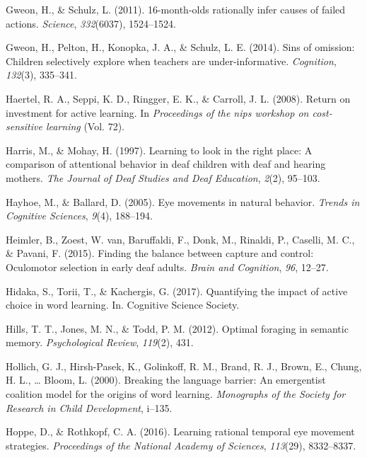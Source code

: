 \documentclass[oneside]{report}
\begin{document}
\hypertarget{ref-gweon201116}{}
Gweon, H., \& Schulz, L. (2011). 16-month-olds rationally infer causes
of failed actions. \emph{Science}, \emph{332}(6037), 1524--1524.

\hypertarget{ref-gweon2014sins}{}
Gweon, H., Pelton, H., Konopka, J. A., \& Schulz, L. E. (2014). Sins of
omission: Children selectively explore when teachers are
under-informative. \emph{Cognition}, \emph{132}(3), 335--341.

\hypertarget{ref-haertel2008return}{}
Haertel, R. A., Seppi, K. D., Ringger, E. K., \& Carroll, J. L. (2008).
Return on investment for active learning. In \emph{Proceedings of the
nips workshop on cost-sensitive learning} (Vol. 72).

\hypertarget{ref-harris1997learning}{}
Harris, M., \& Mohay, H. (1997). Learning to look in the right place: A
comparison of attentional behavior in deaf children with deaf and
hearing mothers. \emph{The Journal of Deaf Studies and Deaf Education},
\emph{2}(2), 95--103.

\hypertarget{ref-hayhoe2005eye}{}
Hayhoe, M., \& Ballard, D. (2005). Eye movements in natural behavior.
\emph{Trends in Cognitive Sciences}, \emph{9}(4), 188--194.

\hypertarget{ref-heimler2015finding}{}
Heimler, B., Zoest, W. van, Baruffaldi, F., Donk, M., Rinaldi, P.,
Caselli, M. C., \& Pavani, F. (2015). Finding the balance between
capture and control: Oculomotor selection in early deaf adults.
\emph{Brain and Cognition}, \emph{96}, 12--27.

\hypertarget{ref-hidaka2017quantifying}{}
Hidaka, S., Torii, T., \& Kachergis, G. (2017). Quantifying the impact
of active choice in word learning. In. Cognitive Science Society.

\hypertarget{ref-hills2012optimal}{}
Hills, T. T., Jones, M. N., \& Todd, P. M. (2012). Optimal foraging in
semantic memory. \emph{Psychological Review}, \emph{119}(2), 431.

\hypertarget{ref-hollich2000breaking}{}
Hollich, G. J., Hirsh-Pasek, K., Golinkoff, R. M., Brand, R. J., Brown,
E., Chung, H. L., \ldots{} Bloom, L. (2000). Breaking the language
barrier: An emergentist coalition model for the origins of word
learning. \emph{Monographs of the Society for Research in Child
Development}, i--135.

\hypertarget{ref-hoppe2016learning}{}
Hoppe, D., \& Rothkopf, C. A. (2016). Learning rational temporal eye
movement strategies. \emph{Proceedings of the National Academy of
Sciences}, \emph{113}(29), 8332--8337.
\end{document}
